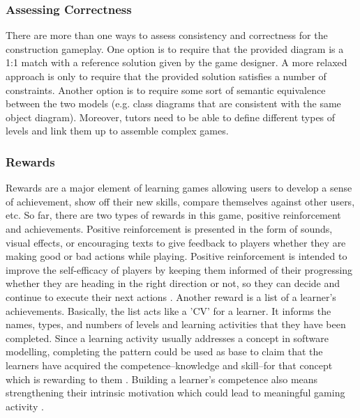 \documentclass[conference]{IEEEtran}
\begin{document}
\subsubsection{Assessing Correctness} 
There are more than one ways to assess consistency and correctness for the construction gameplay. One option is to require that the provided diagram is a 1:1 match with a reference solution given by the game designer. A more relaxed approach is only to require that the provided solution satisfies a number of constraints. Another option is to require some sort of semantic equivalence between the two models (e.g. class diagrams that are consistent with the same object diagram). Moreover, tutors need to be able to define different types of levels and link them up to assemble complex games.

\subsubsection{Rewards}
Rewards are a major element of learning games allowing users to develop a sense of achievement, show off their new skills, compare themselves against other users, etc. So far, there are two types of rewards in this game, positive reinforcement and achievements. Positive reinforcement is presented in the form of sounds, visual effects, or encouraging texts to give feedback to players whether they are making good or bad actions while playing. Positive reinforcement is intended to improve the self-efficacy of players by keeping them informed of their progressing whether they are heading in the right direction or not, so they can decide and continue to execute their next actions \cite{richter2015studying}. Another reward is a list of a learner's achievements. Basically, the list acts like a 'CV' for a learner. It informs the names, types, and numbers of levels and learning activities that they have been completed. Since a learning activity usually addresses a concept in software modelling, completing the pattern could be used as base to claim that the learners have acquired the competence--knowledge and skill--for that concept which is rewarding to them \cite{richter2015studying}. Building a learner's competence also means strengthening their intrinsic motivation \cite{ryan2017self} which could lead to meaningful gaming activity \cite{nicholson2015recipe}.
\end{document}
